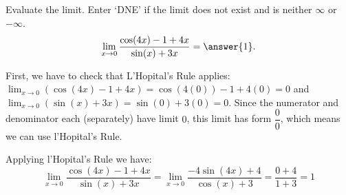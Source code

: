 \documentclass{ximera}
\author{Emma Smith Zbarsky \and Bobby Ramsey}
\begin{document}
\begin{exercise}

Evaluate the limit. Enter `DNE' if the limit does not exist and is neither $\infty$ or $-\infty$. 
 \[\lim_{x \to 0} \frac{\cos(4x)-1+4x}{\sin(x)+3x} = \answer{1}.\]



\begin{hint}
First, we have to check that L'Hopital's Rule applies:
$\displaystyle \lim_{x\to 0} (\cos(4x)-1+4x) = \cos(4(0))-1+4(0) = 0$ and $\displaystyle \lim_{x\to 0} (\sin(x)+3x) = \sin(0)+3(0) = 0$.
Since the numerator and denominator each (separately) have limit $0$, this limit has form $\dfrac{0}{0}$, which means we can use l'Hopital's Rule.

Applying l'Hopital's Rule we have:
\[\lim_{x\to 0} \frac{\cos(4x)-1+4x}{\sin(x)+3x} = \lim_{x\to 0} \frac{-4\sin(4x)+4}{\cos(x)+3} = \frac{0+4}{1+3} = 1\]
\end{hint}



\end{exercise}
\end{document}
